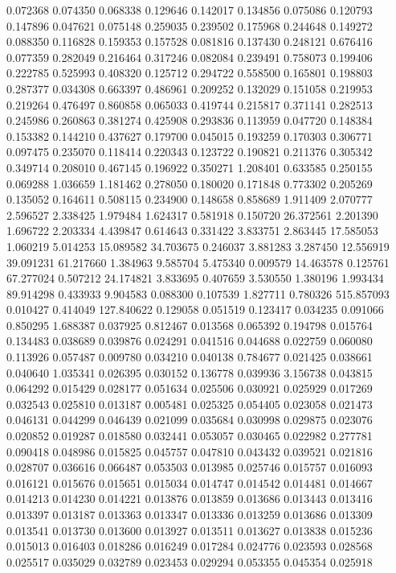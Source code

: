 0.072368
0.074350
0.068338
0.129646
0.142017
0.134856
0.075086
0.120793
0.147896
0.047621
0.075148
0.259035
0.239502
0.175968
0.244648
0.149272
0.088350
0.116828
0.159353
0.157528
0.081816
0.137430
0.248121
0.676416
0.077359
0.282049
0.216464
0.317246
0.082084
0.239491
0.758073
0.199406
0.222785
0.525993
0.408320
0.125712
0.294722
0.558500
0.165801
0.198803
0.287377
0.034308
0.663397
0.486961
0.209252
0.132029
0.151058
0.219953
0.219264
0.476497
0.860858
0.065033
0.419744
0.215817
0.371141
0.282513
0.245986
0.260863
0.381274
0.425908
0.293836
0.113959
0.047720
0.148384
0.153382
0.144210
0.437627
0.179700
0.045015
0.193259
0.170303
0.306771
0.097475
0.235070
0.118414
0.220343
0.123722
0.190821
0.211376
0.305342
0.349714
0.208010
0.467145
0.196922
0.350271
1.208401
0.633585
0.250155
0.069288
1.036659
1.181462
0.278050
0.180020
0.171848
0.773302
0.205269
0.135052
0.164611
0.508115
0.234900
0.148658
0.858689
1.911409
2.070777
2.596527
2.338425
1.979484
1.624317
0.581918
0.150720
26.372561
2.201390
1.696722
2.203334
4.439847
0.614643
0.331422
3.833751
2.863445
17.585053
1.060219
5.014253
15.089582
34.703675
0.246037
3.881283
3.287450
12.556919
39.091231
61.217660
1.384963
9.585704
5.475340
0.009579
14.463578
0.125761
67.277024
0.507212
24.174821
3.833695
0.407659
3.530550
1.380196
1.993434
89.914298
0.433933
9.904583
0.088300
0.107539
1.827711
0.780326
515.857093
0.010427
0.414049
127.840622
0.129058
0.051519
0.123417
0.034235
0.091066
0.850295
1.688387
0.037925
0.812467
0.013568
0.065392
0.194798
0.015764
0.134483
0.038689
0.039876
0.024291
0.041516
0.044688
0.022759
0.060080
0.113926
0.057487
0.009780
0.034210
0.040138
0.784677
0.021425
0.038661
0.040640
1.035341
0.026395
0.030152
0.136778
0.039936
3.156738
0.043815
0.064292
0.015429
0.028177
0.051634
0.025506
0.030921
0.025929
0.017269
0.032543
0.025810
0.013187
0.005481
0.025325
0.054405
0.023058
0.021473
0.046131
0.044299
0.046439
0.021099
0.035684
0.030998
0.029875
0.023076
0.020852
0.019287
0.018580
0.032441
0.053057
0.030465
0.022982
0.277781
0.090418
0.048986
0.015825
0.045757
0.047810
0.043432
0.039521
0.021816
0.028707
0.036616
0.066487
0.053503
0.013985
0.025746
0.015757
0.016093
0.016121
0.015676
0.015651
0.015034
0.014747
0.014542
0.014481
0.014667
0.014213
0.014230
0.014221
0.013876
0.013859
0.013686
0.013443
0.013416
0.013397
0.013187
0.013363
0.013347
0.013336
0.013259
0.013686
0.013309
0.013541
0.013730
0.013600
0.013927
0.013511
0.013627
0.013838
0.015236
0.015013
0.016403
0.018286
0.016249
0.017284
0.024776
0.023593
0.028568
0.025517
0.035029
0.032789
0.023453
0.029294
0.053355
0.045354
0.025918

